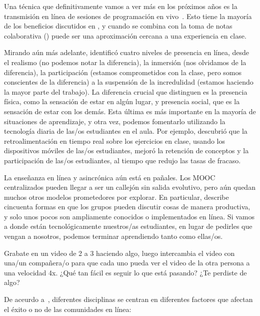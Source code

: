 Una técnica que definitivamente vamos a ver más en los próximos años es
la transmisión en línea de sesiones de programación en vivo~\cite{Raj2018,Haar2017}.
Esto tiene la mayoría de los beneficios discutidos en ,
y cuando se combina con la toma de notas colaborativa ()
puede ser una aproximación cercana a una experiencia en clase.

Mirando aún más adelante,
\cite{Ijss2000} identificó cuatro niveles de presencia en línea,
desde el realismo (no podemos notar la diferencia),
la inmersión (nos olvidamos de la diferencia),
la participación (estamos comprometidos con la clase, pero somos conscientes de la diferencia)
a la suspensión de la incredulidad (estamos haciendo la mayor parte del trabajo).
La diferencia crucial que distinguen es
la presencia física, como 
la sensación de estar en algún lugar,
y presencia social, que es la sensación de estar con los demás.
Esta última es más importante en la mayoría de situaciones de aprendizaje,
y otra vez,
podemos fomentarlo utilizando la tecnología diaria de las/os estudiantes en el aula.
Por ejemplo,
\cite{Deb2018} descubrió que la retroalimentación en tiempo real sobre los ejercicios en clase,
usando los dispositivos móviles de las/os estudiantes, mejoró la retención de conceptos y 
la participación de las/os estudiantes, al tiempo que redujo las tasas de fracaso.

La enseñanza en línea y asincrónica aún está en pañales.
Los MOOC centralizados pueden llegar a ser un callejón sin salida evolutivo,
pero aún quedan muchos otros modelos prometedores por explorar.
En particular,
\cite{Broo2016} describe cincuenta formas en que los grupos pueden discutir cosas de manera productiva,
y solo unos pocos son ampliamente conocidos o implementados en línea.
Si vamos a donde están tecnológicamente nuestros/as estudiantes,
en lugar de pedirles que vengan a nosotros,
podemos terminar aprendiendo tanto como ellas/os.



Grabate en un video de 2 a 3 haciendo algo,
luego intercambia el video con una/un compañera/o
para que cada uno pueda ver el video de la otra persona a una velocidad 4x.
¿Qué tan fácil es seguir lo que está pasando?
¿Te perdiste de algo?


De aceurdo a~\cite{Irib2009},
diferentes disciplinas se centran en diferentes factores
que afectan el éxito o no de las comunidades en línea:

